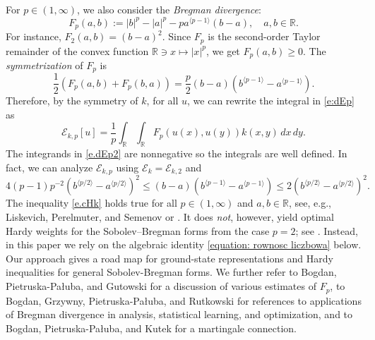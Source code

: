 \documentclass[12pt, a4paper]{amsart}
\newcommand{\R}{\mathbb{R}}
\newcommand{\E}{\mathcal{E}}
\begin{document}
For $p\in (1,\infty)$, we also consider the \textit{Bregman divergence}:
\begin{equation}
F_p(a,b) := |b|^p - |a|^p - pa^{\langle p - 1 \rangle} (b-a), \quad a, b \in \R.
\end{equation}
For instance, $F_2(a,b)= (b-a)^2$.
Since $F_p$ is the second-order Taylor remainder of the convex function $\R\ni x\mapsto |x|^p$, we get $F_p(a,b) \geq 0$.
The
\textit{symmetrization} of $F_p$ is
\begin{equation}\label{e:fp}
\frac12 (F_p(a,b) + F_p(b,a)) =\frac{p}{2} (b-a)(b^{\langle p - 1 \rangle} -a^{\langle p - 1 \rangle} ).
\end{equation}
Therefore, by the symmetry of $k$, for all $u$, we can rewrite the integral in \eqref{e:dEp} as
\begin{equation}\label{e.dEp2}
\E_{k, p}[u] =
 \frac{1}{p}\int_{\R}\int_{\R}F_p(u(x), u(y))k(x, y)\,dx\,dy.
\end{equation}
The integrands in \eqref{e.dEp2} are nonnegative so the integrals are well defined.
In fact, we can analyze $\E_{k, p}$ using  $\E_k=\E_{k, 2}$ and
\begin{equation}\label{e.cHk}
4(p-1)p^{-2}(b^{\langle p/2\rangle}-a^{\langle p/2\rangle})^2\leq (b-a)(b^{\langle p-1\rangle}-a^{\langle p-1\rangle})\leq 2(b^{\langle p/2\rangle}-a^{\langle p/2\rangle})^2.
\end{equation}
The inequality \eqref{e.cHk} 
holds true for all $p\in (1,\infty)$ and $a,b\in \R$, see, e.g., Liskevich, Perelmuter, and Semenov \cite[Lemma 2.1]{MR1407327} or \cite{MR4885983}. It does \textit{not}, however, yield  optimal Hardy weights for the Sobolev--Bregman forms from the case $p=2$; see \cite{MR4372148}.  Instead, in this paper we rely on the algebraic identity \eqref{equation: rownosc liczbowa} below. Our approach gives a road map for ground-state representations and Hardy inequalities for general Sobolev-Bregman forms.
We further refer to Bogdan, Pietruska-Pa{\l}uba, and Gutowski \cite[(2.12)-(2.14)]{MR4851904} for a discussion of various estimates of $F_p$, to Bogdan, Grzywny, Pietruska-Pa{\l}uba, and Rutkowski \cite{MR4589708} for references to applications of Bregman divergence in analysis, statistical learning, and optimization, and to Bogdan, Pietruska-Pa{\l}uba, and Kutek \cite{bogdan2024bregmanvariationsemimartingales} for a martingale connection. 
\end{document}

